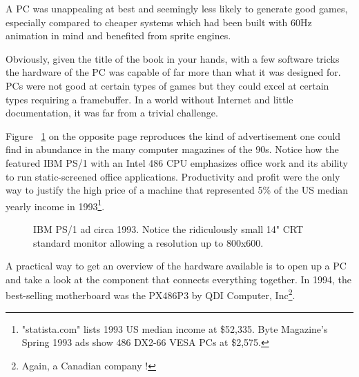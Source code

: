 \par
 A PC was unappealing at best and seemingly less likely to generate good games, especially compared to cheaper systems which had been built with 60Hz animation in mind and benefited from sprite engines.\\
 \par
  Obviously, given the title of the book in your hands, with a few software tricks the hardware of the PC was capable of far more than what it was designed for. PCs were not good at certain types of games but they could excel at certain types requiring a framebuffer. In a world without Internet and little documentation, it was far from a trivial challenge.\\
\par

Figure ~\ref{ibm_ps1_top} on the opposite page reproduces the kind of advertisement one could find in abundance in the many computer magazines of the 90s. Notice how the featured IBM PS/1 with an Intel 486 CPU emphasizes office work and its ability to run static-screened office applications. Productivity and profit were the only way to justify the high price of a machine that represented 5\% of the US median yearly income in 1993\footnote{ "statista.com" lists 1993 US median income at \$52,335. Byte Magazine's Spring 1993 ads show 486 DX2-66 VESA PCs at \$2,575.}.\\
\par

\par
\begin{figure}[H] \centering
{}
\caption{IBM PS/1 ad circa 1993. Notice the ridiculously small 14" CRT standard monitor allowing a resolution up to 800x600.}
\label{ibm_ps1_top}
\end{figure}


















\cleartoleftpage
 
A practical way to get an overview of the hardware available is to open up a PC and take a look at the component that connects everything together. In 1994, the best-selling motherboard was the PX486P3 by QDI Computer, Inc\footnote{Again, a Canadian company  !}.\\

